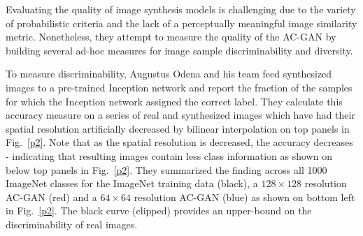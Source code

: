 \documentclass[10pt,twocolumn,letterpaper]{article}
\begin{document}
Evaluating the quality of image synthesis models is challenging due to the variety of probabilistic criteria \cite{Theis2015A} and the lack of a perceptually meaningful image similarity metric. Nonetheless, they attempt to measure the quality of the AC-GAN by building several ad-hoc measures for image sample discriminability and diversity.

To measure discriminability, Augustus Odena and his team feed synthesized images to a pre-trained Inception network \cite{Szegedy2016Rethinking} and report the fraction of the samples for which the Inception network assigned the correct label. They calculate this accuracy measure on a series of real and synthesized images which have had their spatial resolution artificially decreased by bilinear interpolation on top panels in Fig.~\ref{p2}. Note that as the spatial resolution is decreased, the accuracy decreases - indicating that resulting images contain less class information as shown on below top panels in Fig.~\ref{p2}. They summarized the finding across all 1000 ImageNet classes for the ImageNet training data (black), a $128\times 128$ resolution AC-GAN (red) and a $64\times 64$ resolution AC-GAN (blue) as shown on bottom left in Fig.~\ref{p2}. The black curve (clipped) provides an upper-bound on the discriminability of real images.

{\small


}
\end{document}
